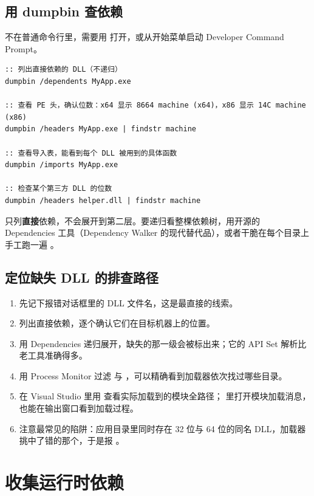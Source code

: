 \subsection{用 dumpbin 查依赖}
 不在普通命令行里，需要用  打开，或从开始菜单启动 Developer Command Prompt。

\begin{lstlisting}[style=shellstyle]
:: 列出直接依赖的 DLL（不递归）
dumpbin /dependents MyApp.exe

:: 查看 PE 头，确认位数：x64 显示 8664 machine (x64)，x86 显示 14C machine (x86)
dumpbin /headers MyApp.exe | findstr machine

:: 查看导入表，能看到每个 DLL 被用到的具体函数
dumpbin /imports MyApp.exe

:: 检查某个第三方 DLL 的位数
dumpbin /headers helper.dll | findstr machine
\end{lstlisting}

\begin{tipbox}[提示]
 只列\textbf{直接}依赖，不会展开到第二层。要递归看整棵依赖树，用开源的 Dependencies 工具（Dependency Walker 的现代替代品），或者干脆在每个目录上手工跑一遍 。
\end{tipbox}
\subsection{定位缺失 DLL 的排查路径}
\begin{enumerate}
  \item 先记下报错对话框里的 DLL 文件名，这是最直接的线索。
  \item {} 列出直接依赖，逐个确认它们在目标机器上的位置。
  \item 用 Dependencies 递归展开，缺失的那一级会被标出来；它的 API Set 解析比老工具准确得多。
  \item 用 Process Monitor 过滤  与 ，可以精确看到加载器依次找过哪些目录。
  \item 在 Visual Studio 里用  查看实际加载到的模块全路径； 里打开模块加载消息，也能在输出窗口看到加载过程。
  \item 注意最常见的陷阱：应用目录里同时存在 32 位与 64 位的同名 DLL，加载器挑中了错的那个，于是报 。
\end{enumerate}
\section{收集运行时依赖}
